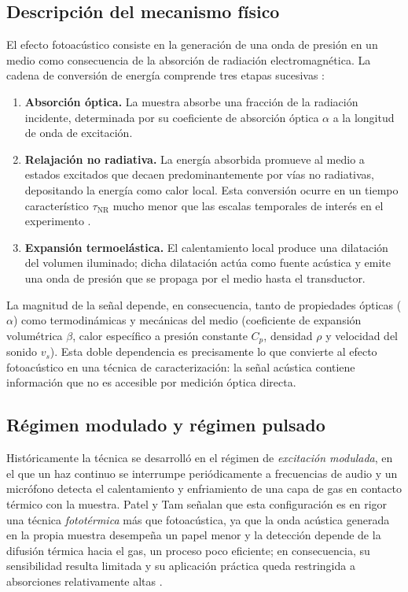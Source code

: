 \subsection*{Descripción del mecanismo físico}

El efecto fotoacústico consiste en la generación de una onda de
presión en un medio como consecuencia de la absorción de radiación
electromagnética. La cadena de conversión de energía comprende tres
etapas sucesivas \cite{Marin2008}:

\begin{enumerate}
    \item \textbf{Absorción óptica.} La muestra absorbe una fracción
    de la radiación incidente, determinada por su coeficiente de
    absorción óptica $\alpha$ a la longitud de onda de excitación.

    \item \textbf{Relajación no radiativa.} La energía absorbida
    promueve al medio a estados excitados que decaen predominantemente
    por vías no radiativas, depositando la energía como calor local.
    Esta conversión ocurre en un tiempo característico
    $\tau_\text{NR}$ mucho menor que las escalas temporales de
    interés en el experimento \cite{PatelTam1981}.

    \item \textbf{Expansión termoelástica.} El calentamiento local
    produce una dilatación del volumen iluminado; dicha dilatación
    actúa como fuente acústica y emite una onda de presión que se
    propaga por el medio hasta el transductor.
\end{enumerate}

La magnitud de la señal depende, en consecuencia, tanto de propiedades
ópticas ($\alpha$) como termodinámicas y mecánicas del medio
(coeficiente de expansión volumétrica $\beta$, calor específico a
presión constante $C_p$, densidad $\rho$ y velocidad del sonido
$v_s$). Esta doble dependencia es precisamente lo que convierte al
efecto fotoacústico en una técnica de caracterización: la señal
acústica contiene información que no es accesible por medición
óptica directa.

\subsection*{Régimen modulado y régimen pulsado}

Históricamente la técnica se desarrolló en el régimen de
\textit{excitación modulada}, en el que un haz continuo se interrumpe
periódicamente a frecuencias de audio y un micrófono detecta el
calentamiento y enfriamiento de una capa de gas en contacto térmico
con la muestra. Patel y Tam señalan que esta configuración es en
rigor una técnica \textit{fototérmica} más que fotoacústica, ya que
la onda acústica generada en la propia muestra desempeña un papel
menor y la detección depende de la difusión térmica hacia el gas,
un proceso poco eficiente; en consecuencia, su sensibilidad resulta
limitada y su aplicación práctica queda restringida a absorciones
relativamente altas \cite{PatelTam1981}.


